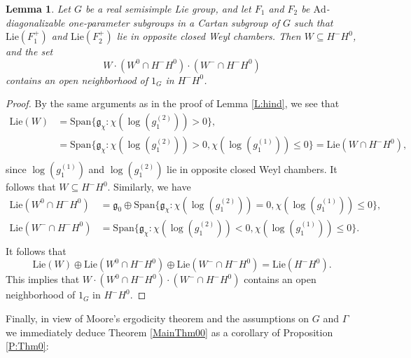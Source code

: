 \documentclass[reqno,12pt]{amsart}
\newtheorem{lemma}[theorem]{Lemma}
\theoremstyle{definition}
\numberwithin{equation}{section}
\newcommand{\Ad}{\mathrm{Ad}}
\newcommand{\Lie}{\mathrm{Lie}}
\newcommand{\Span}{\mathrm{Span}}
\begin{document}
{{\begin{lemma}
    Let $G$ be a real semisimple Lie group, {and let} $F_1$ and $F_2$ be $\Ad$-diagonalizable one-parameter subgroups in a Cartan subgroup of $G$ such that $\Lie(F_1^+)$ and $\Lie(F_2^+)$ lie in opposite closed Weyl chambers. Then $W\subseteq H^-H^0$, and {the set} $$W\cdot (W^0\cap H^-H^0)\cdot (W^-\cap H^-H^0)$$ contains an open neighborhood of $1_G$ in $H^-H^0$. %
\end{lemma}
\begin{proof}
By the same arguments as in the proof of Lemma \ref{L:hind}, we see that \begin{equation*}
    \begin{aligned}
        \Lie(W)&=\Span\{\mathfrak{g}_{\chi}:\chi(\log(g^{(2)}_1))>0\},\\
        &=\Span\{\mathfrak{g}_{\chi}:\chi(\log(g^{(2)}_1))>0,\chi(\log(g^{(1)}_1))\leq 0\}=\Lie(W\cap H^-H^0),\\
    \end{aligned}
\end{equation*}
since $\log(g^{(1)}_1)$ and $\log(g^{(2)}_1)$ lie in opposite closed Weyl chambers. It follows that $W\subseteq H^-H^0$. Similarly, we have \begin{equation*}
    \begin{aligned}
        \Lie(W^0\cap H^-H^0)
        &=\mathfrak{g}_0\oplus\Span\{\mathfrak{g}_{\chi}:\chi(\log(g^{(2)}_1))=0,\chi(\log(g^{(1)}_1))\leq 0\},\\
        \Lie(W^-\cap H^-H^0)
        &=\Span\{\mathfrak{g}_{\chi}:\chi(\log(g^{(2)}_1))< 0,\chi(\log(g^{(1)}_1))\leq 0\}.\\
    \end{aligned}
\end{equation*}
It follows that $$
\Lie(W)\oplus \Lie(W^0\cap H^-H^0)\oplus \Lie(W^-\cap H^-H^0)=\Lie(H^-H^0).
$$
This implies that $W\cdot (W^0\cap H^-H^0)\cdot (W^-\cap H^-H^0)$ contains an open neighborhood of $1_G$ in $H^-H^0$. %
\end{proof}
}


Finally, in view of Moore's ergodicity theorem {and the assumptions on $G$ and $\Gamma$} we immediately deduce Theorem \ref{MainThm00} as a corollary of Proposition \ref{P:Thm0}:

}
\end{document}
